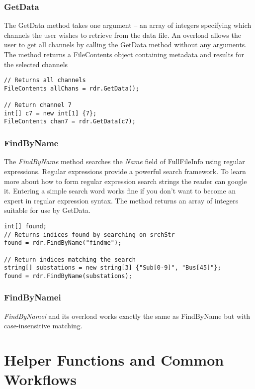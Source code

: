 \documentclass[11pt,letterpaper,article]{memoir} %
\begin{document}
\subsection{GetData}
The GetData method takes one argument -- an array of integers specifying which channels the user wishes to retrieve from the data file. An overload allows the user to get all channels by calling the GetData method without any arguments. The method returns a FileContents object containing metadata and results for the selected channels

\lstset{language=C}
\begin{lstlisting}
// Returns all channels
FileContents allChans = rdr.GetData(); 

// Return channel 7
int[] c7 = new int[1] {7};
FileContents chan7 = rdr.GetData(c7);
\end{lstlisting}


\subsection{FindByName}
The {\em FindByName} method searches the {\em Name} field of FullFileInfo using regular expressions. Regular expressions provide a powerful search framework. To learn more about how to form regular expression search strings the reader can google it. Entering a simple search word works fine if you don't want to become an expert in regular expression syntax. The method returns an array of integers suitable for use by GetData.

\lstset{language=C}
\begin{lstlisting}
int[] found;
// Returns indices found by searching on srchStr
found = rdr.FindByName("findme"); 

// Return indices matching the search
string[] substations = new string[3] {"Sub[0-9]", "Bus[45]"};
found = rdr.FindByName(substations);
\end{lstlisting}


\subsection{FindByNamei}
{\em FindByNamei} and its overload works exactly the same as FindByName but with case-insensitive matching.







\chapter{Helper Functions and Common Workflows}
\end{document}
